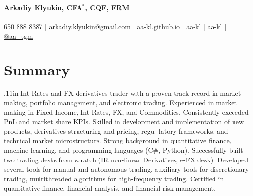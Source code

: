 \documentclass[letterpaper,hidelinks]{article}
\begin{document}

\begin{center}
  \textbf{\Huge{Arkadiy Klyukin, CFA$\mathbb{}^\ast$, CQF, FRM}\\} \\ \vspace{1pt}
  \small
  \faMobile* \hspace{.5pt} \href{tel:+16508888387}{650 888 8387}
  $|$
  \faAt \hspace{.5pt} \href{mailto:arkadiy.klyukin@gmail.com}{arkadiy.klyukin@gmail.com}
  $|$
  \faGlobeAmericas \hspace{.5pt} \href{https://aa-kl.github.io}{aa-kl.github.io}
  $|$
  \faGithub \hspace{.5pt} \href{https://github.com/aa-kl}{aa-kl}
  $|$
  \faLinkedinIn \hspace{.5pt} \href{https://www.linkedin.com/in/aa-kl}{aa-kl}
  $|$
  \faTelegramPlane \hspace{.5pt} \href{https://t.me/aa_tgm}{@aa\_tgm}
\end{center}
\vspace{-26pt}
\section{Summary}
{\hspace{0.1in}
\raggedright{\leftskip.11in
    Int Rates and FX derivatives trader with a proven track record in market making, portfolio management, and electronic trading. Experienced in market making in Fixed Income, Int Rates, FX, and Commodities. Consistently exceeded PnL and market share KPIs. Skilled in development and implementation of new products, derivatives structuring and pricing, regu- latory frameworks, and technical market microstructure. Strong background in quantitative finance, machine learning, and programming languages (C\#, Python). Successfully built two trading desks from scratch (IR non-linear Derivatives, e-FX desk). Developed several tools for manual and autonomous trading, auxiliary tools for discretionary trading, multithreaded algorithms for high-frequency trading. Certified in quantitative finance, financial analysis, and financial risk management.
    \\}
}
\vspace{-7pt}
\end{document}
